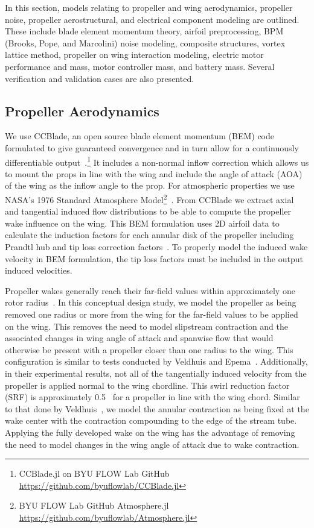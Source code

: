 \documentclass[conf]{new-aiaa}
\begin{document}
In this section, models relating to propeller and wing aerodynamics, propeller noise, propeller aerostructural, and electrical component modeling are outlined. These include blade element momentum theory, airfoil preprocessing, BPM (Brooks, Pope, and Marcolini) noise modeling, composite structures, vortex lattice method, propeller on wing interaction modeling, electric motor performance and mass, motor controller mass, and battery mass. Several verification and validation cases are also presented.

\subsection{Propeller Aerodynamics}


We use CCBlade, an open source blade element momentum (BEM) code formulated to give guaranteed convergence and in turn allow for a continuously differentiable output~\cite{ccblade}.\footnote{CCBlade.jl on BYU FLOW Lab GitHub \href{https://github.com/byuflowlab/CCBlade.jl}{https://github.com/byuflowlab/CCBlade.jl}} It includes a non-normal inflow correction which allows us to mount the props in line with the wing and include the angle of attack (AOA) of the wing as the inflow angle to the prop. For atmospheric properties we use NASA's 1976 Standard Atmosphere Model\footnote{BYU FLOW Lab GitHub Atmosphere.jl \href{https://github.com/byuflowlab/Atmosphere.jl}{https://github.com/byuflowlab/Atmosphere.jl}}~\cite{Atmosphere:2014aa}. From CCBlade we extract axial and tangential induced flow distributions to be able to compute the propeller wake influence on the wing. This BEM formulation uses 2D airfoil data to calculate the induction factors for each annular disk of the propeller including Prandtl hub and tip loss correction factors~\cite{tip-correction}. To properly model the induced wake velocity in BEM formulation, the tip loss factors must be included in the output induced velocities.

Propeller wakes generally reach their far-field values within approximately one rotor radius~\cite{Alvarez:2018aa}. In this conceptual design study, we model the propeller as being removed one radius or more from the wing for the far-field values to be applied on the wing. This removes the need to model slipstream contraction and the associated changes in wing angle of attack and spanwise flow that would otherwise be present with a propeller closer than one radius to the wing. This configuration is similar to tests conducted by Veldhuis and Epema~\cite{proponwing, epema}. Additionally, in their experimental results, not all of the tangentially induced velocity from the propeller is applied normal to the wing chordline. This swirl reduction factor (SRF) is approximately 0.5~\cite{proponwing} for a propeller in line with the wing chord. Similar to that done by Veldhuis~\cite{proponwing}, we model the annular contraction as being fixed at the wake center with the contraction compounding to the edge of the stream tube. Applying the fully developed wake on the wing has the advantage of removing the need to model changes in the wing angle of attack due to wake contraction.
\end{document}
